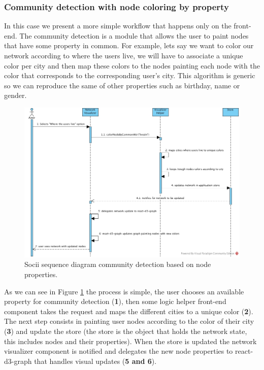 \subsubsection{Community detection with node coloring by property}

In this case we present a more simple workflow that happens only on the front-end. The community detection is a module that allows the user to paint nodes that have some property in common. For example, lets say we want to color our network according to where the users live, we will have to associate a unique color per city and then map these colors to the nodes painting each node with the color that corresponds to the corresponding user's city. This algorithm is generic so we can reproduce the same of other properties such as birthday, name or gender.

\begin{figure}[h!]
\begin{center}
  \hspace*{-0.8in}
  \includegraphics[width=1.2\textwidth]{img/socii-cdet.jpg}
\end{center}
\caption{\label{img:sociicdet} Socii sequence diagram community detection based on node properties.}
\end{figure}

As we can see in Figure \ref{img:sociicdet} the process is simple, the user chooses an available property for community detection (\textbf{1}), then some logic helper front-end component takes the request and maps the different cities to a unique color (\textbf{2}). The next step consists in painting user nodes according to the color of their city (\textbf{3}) and update the store (the store is the object that holds the network state, this includes nodes and their properties). When the store is updated the network visualizer component is notified and delegates the new node properties to react-d3-graph that handles visual updates (\textbf{5 and 6}).
